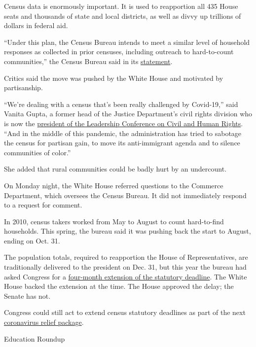 Census data is enormously important. It is used to reapportion all 435
House seats and thousands of state and local districts, as well as divvy
up trillions of dollars in federal aid.

``Under this plan, the Census Bureau intends to meet a similar level of
household responses as collected in prior censuses, including outreach
to hard-to-count communities,'' the Census Bureau said in its
\href{https://www.census.gov/newsroom/press-releases/2020/delivering-complete-accurate-count.html}{statement}.

Critics said the move was pushed by the White House and motivated by
partisanship.

``We're dealing with a census that's been really challenged by
Covid-19,'' said Vanita Gupta, a former head of the Justice Department's
civil rights division who is now the
\href{https://civilrights.org/about/our-staff/vanita-gupta/}{president
of the Leadership Conference on Civil and Human Rights}. ``And in the
middle of this pandemic, the administration has tried to sabotage the
census for partisan gain, to move its anti-immigrant agenda and to
silence communities of color.''

She added that rural communities could be badly hurt by an undercount.

On Monday night, the White House referred questions to the Commerce
Department, which oversees the Census Bureau. It did not immediately
respond to a request for comment.

In 2010, census takers worked from May to August to count hard-to-find
households. This spring, the bureau said it was pushing back the start
to August, ending on Oct. 31.

The population totals, required to reapportion the House of
Representatives, are traditionally delivered to the president on Dec.
31, but this year the bureau had asked Congress for a
\href{https://www.nytimes3xbfgragh.onion/2020/04/13/us/census-coronavirus-delay.html?searchResultPosition=9}{four-month
extension of the statutory deadline}. The White House backed the
extension at the time. The House approved the delay; the Senate has not.

Congress could still act to extend census statutory deadlines as part of
the next
\href{https://www.nytimes3xbfgragh.onion/2020/08/02/us/politics/coronavirus-jobless-aid.html}{coronavirus
relief package}.

Education Roundup

\hypertarget{-3}{%
\subsection{}\label{-3}}


